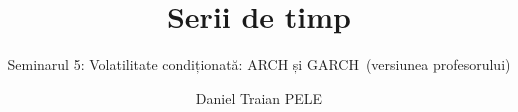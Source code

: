 \title[Serii de timp]{Serii de timp}
\subtitle{Seminarul 5: Volatilitate condiționată: ARCH și GARCH\ifsolutions\ (versiunea profesorului)\fi}
\author[D.T. Pele]{Daniel Traian PELE}
\date{}

\providecommand{\tsaapplink}[3]{\hypertarget{#2}{}\hyperlink{#1}{\beamergotobutton{#3}}}  %
\providecommand{\tsaappback}[2]{\begin{tikzpicture}[remember picture,overlay]\node[anchor=south east] at ([xshift=-3mm,yshift=7mm]current page.south east){\hyperlink{#1}{\beamerreturnbutton{#2}}};\end{tikzpicture}}  %
\providecommand{\tsachlink}[2]{\href{#1}{#2}}  %
\providecommand{\tsachlinkt}[2]{\href{#1}{\usebeamercolor[fg]{frametitle}#2}}  %


